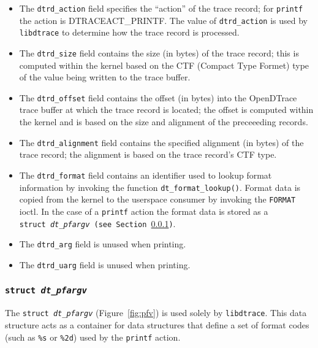 \begin{itemize}

	\item The \texttt{dtrd\_action} field specifies the ``action'' of the
trace record; for \texttt{printf} the action is DTRACEACT\_PRINTF. The value of
\texttt{dtrd\_action} is used by \texttt{libdtrace} to determine how the trace
record is processed.

	\item The \texttt{dtrd\_size} field contains the size (in bytes) of the
trace record; this is computed within the kernel based on the CTF (Compact Type
Formet) type of the value being written to the trace buffer.

	\item The \texttt{dtrd\_offset} field contains the offset (in bytes)
into the OpenDTrace trace buffer at which the trace record is located; the offset
is computed within the kernel and is based on the size and alignment of the
preceeeding records.

	\item The \texttt{dtrd\_alignment} field contains the specified
alignment (in bytes) of the trace record; the alignment is based on the trace
record's CTF type.

	\item The \texttt{dtrd\_format} field contains an identifier used to lookup
format information by invoking the function \texttt{dt\_format\_lookup()}.
Format data is copied from the kernel to the userspace consumer by invoking the
\texttt{FORMAT} ioctl. In the case of a \texttt{printf} action the format data
is stored as a \texttt{struct~\textit{dt\_pfargv} (see
Section~\ref{subsubsec:pfv})}. 

	\item The \texttt{dtrd\_arg} field is unused when printing.

	\item The \texttt{dtrd\_uarg} field is unused when printing.

\end{itemize}

\subsubsection{\texttt{struct~\textit{dt\_pfargv}}}
\label{subsubsec:pfv}

The \texttt{struct~\textit{dt\_pfargv}} (Figure~\ref{fig:pfv}) is used solely
by \texttt{libdtrace}. This data structure acts as a container for data
structures that define a set of format codes (such as \texttt{\%s} or
\texttt{\%2d}) used by the \texttt{printf} action.

